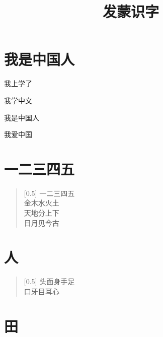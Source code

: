 \documentclass[12pt,UTF-8,openany]{ctexbook}
\title{\zihao{0} \bfseries 发蒙识字}
\author{}
\date{}
\begin{document}
\maketitle
\tableofcontents
\newpage

\chapter{我是中国人}

\begin{large}
    
    我上学了
    
    我学中文
    
    我是中国人
    
    我爱中国
    
\end{large}





\chapter{一二三四五}

\begin{large}
    
    \begin{verse}[0.5\linewidth]
        一二三四五 \\
        金木水火土 \\
        天地分上下 \\
        日月见今古
    \end{verse}
    
\end{large}





\chapter{人}

\begin{large}
    
    \begin{verse}[0.5\linewidth]
        头面身手足 \\
        口牙目耳心
    \end{verse}
    
\end{large}





\chapter{田}
\end{document}
